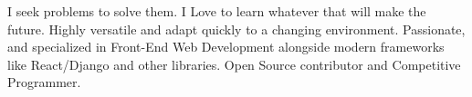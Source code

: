

\begin{cvparagraph}

I seek problems to solve them. I Love to learn whatever that will make the future. Highly versatile and adapt quickly to a changing environment. Passionate, and specialized in Front-End Web Development alongside modern frameworks like React/Django and other libraries. Open Source contributor and Competitive Programmer. 
\end{cvparagraph}